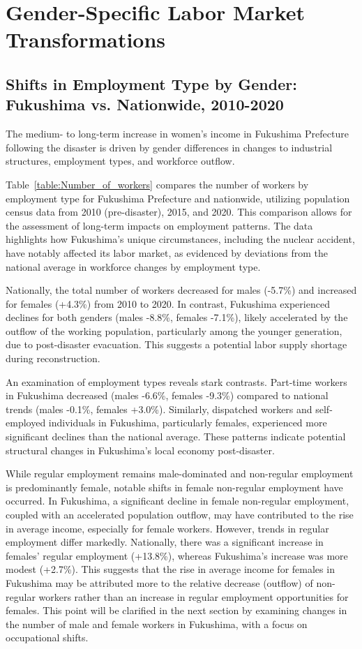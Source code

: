 \documentclass[a4paper,12pt]{article}
\begin{document}

\section{Gender-Specific Labor Market Transformations}

\subsection{Shifts in Employment Type by Gender: Fukushima vs. Nationwide, 2010-2020}

The medium- to long-term increase in women’s income in Fukushima Prefecture following the disaster is driven by gender differences in changes to industrial structures, employment types, and workforce outflow. 

Table~\ref{table:Number_of_workers} compares the number of workers by employment type for Fukushima Prefecture and nationwide, utilizing population census data from 2010 (pre-disaster), 2015, and 2020. This comparison allows for the assessment of long-term impacts on employment patterns. The data highlights how Fukushima's unique circumstances, including the nuclear accident, have notably affected its labor market, as evidenced by deviations from the national average in workforce changes by employment type.

Nationally, the total number of workers decreased for males (-5.7\%) and increased for females (+4.3\%) from 2010 to 2020. In contrast, Fukushima experienced declines for both genders (males -8.8\%, females -7.1\%), likely accelerated by the outflow of the working population, particularly among the younger generation, due to post-disaster evacuation. This suggests a potential labor supply shortage during reconstruction.

An examination of employment types reveals stark contrasts. Part-time workers in Fukushima decreased (males -6.6\%, females -9.3\%) compared to national trends (males -0.1\%, females +3.0\%). Similarly, dispatched workers and self-employed individuals in Fukushima, particularly females, experienced more significant declines than the national average. These patterns indicate potential structural changes in Fukushima's local economy post-disaster.

While regular employment remains male-dominated and non-regular employment is predominantly female, notable shifts in female non-regular employment have occurred. In Fukushima, a significant decline in female non-regular employment, coupled with an accelerated population outflow, may have contributed to the rise in average income, especially for female workers. However, trends in regular employment differ markedly. Nationally, there was a significant increase in females' regular employment (+13.8\%), whereas Fukushima's increase was more modest (+2.7\%). This suggests that the rise in average income for females in Fukushima may be attributed more to the relative decrease (outflow) of non-regular workers rather than an increase in regular employment opportunities for females. This point will be clarified in the next section by examining changes in the number of male and female workers in Fukushima, with a focus on occupational shifts.
\end{document}
